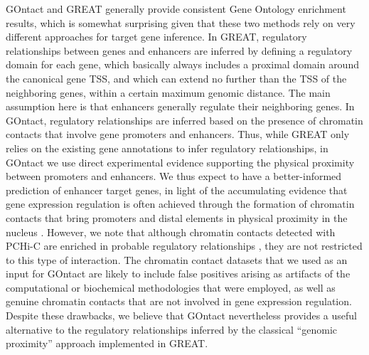 GOntact and GREAT generally provide consistent Gene Ontology enrichment results, which is somewhat surprising given that these two methods rely on very different approaches for target gene inference. In GREAT, regulatory relationships between genes and enhancers are inferred by defining a regulatory domain for each gene, which basically always includes a proximal domain around the canonical gene TSS, and which can extend no further than the TSS of the neighboring genes, within a certain maximum genomic distance. The main assumption here is that enhancers generally regulate their neighboring genes. In GOntact, regulatory relationships are inferred based on the presence of chromatin contacts that involve gene promoters and enhancers. Thus, while GREAT only relies on the existing gene annotations to infer regulatory relationships, in GOntact we use direct experimental evidence supporting the physical proximity between promoters and enhancers. We thus expect to have a better-informed prediction of enhancer target genes, in light of the accumulating evidence that gene expression regulation is often achieved through the formation of chromatin contacts that bring promoters and distal elements in physical proximity in the nucleus \citep{lettice_long-range_2003, sagai_elimination_2005, schoenfelder_pluripotent_2015, mifsud_mapping_2015,javierre_lineage-specific_2016, schoenfelder_long-range_2019}. However, we note that although chromatin contacts detected with PCHi-C are enriched in probable regulatory relationships \citep{schoenfelder_pluripotent_2015,mifsud_mapping_2015}, they are not restricted to this type of interaction. The chromatin contact datasets that we used as an input for GOntact are likely to include false positives arising as artifacts of the computational or biochemical methodologies that were employed, as well as genuine chromatin contacts that are not involved in gene expression regulation. Despite these drawbacks, we believe that GOntact nevertheless provides a useful alternative to the regulatory relationships inferred by the classical “genomic proximity” approach implemented in GREAT. \\

